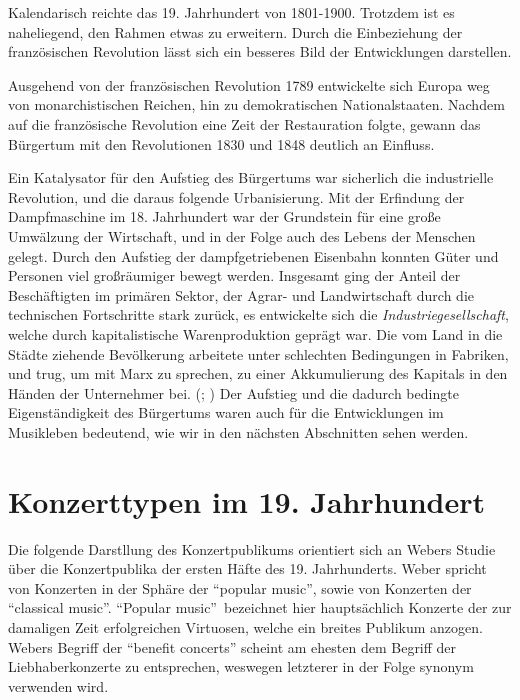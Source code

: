 \documentclass[a4paper, german, oneside]{scrbook}
\newcommand{\citep}[1]{\parencite{#1}}
\begin{document}
Kalendarisch reichte das 19. Jahrhundert von 1801-1900. Trotzdem ist es naheliegend, den Rahmen etwas zu erweitern. Durch die Einbeziehung der französischen Revolution lässt sich ein besseres Bild der Entwicklungen darstellen.

Ausgehend von der französischen Revolution 1789 entwickelte sich Europa weg von monarchistischen Reichen, hin zu demokratischen Nationalstaaten. Nachdem auf die französische Revolution eine Zeit der Restauration folgte, gewann das Bürgertum mit den Revolutionen 1830 und 1848 deutlich an Einfluss. \parencite[vgl.][253ff.]{demandt_kleine_2003}

Ein Katalysator für den Aufstieg des Bürgertums war sicherlich die industrielle Revolution, und die daraus folgende Urbanisierung. Mit der Erfindung der Dampfmaschine im 18. Jahrhundert war der Grundstein für eine große Umwälzung der Wirtschaft, und in der Folge auch des Lebens der Menschen gelegt. Durch den Aufstieg der dampfgetriebenen Eisenbahn konnten Güter und Personen viel großräumiger bewegt werden. Insgesamt ging der Anteil der Beschäftigten im primären Sektor, der Agrar- und Landwirtschaft durch die technischen Fortschritte stark zurück, es entwickelte sich die \emph{Industriegesellschaft}, welche durch kapitalistische Warenproduktion geprägt war. Die vom Land in die Städte ziehende Bevölkerung arbeitete unter schlechten Bedingungen in Fabriken, und trug, um mit Marx zu sprechen, zu einer Akkumulierung des Kapitals in den Händen der Unternehmer bei. (\cite{marx_kapital:_1989}; \cite[368]{hillmann_worterbuch_2007}) Der Aufstieg und die dadurch bedingte Eigenständigkeit des Bürgertums waren auch für die Entwicklungen im Musikleben bedeutend, wie wir in den nächsten Abschnitten sehen werden.


\section{Konzerttypen im 19. Jahrhundert}
\label{konzerttypen}
Die folgende Darstllung des Konzertpublikums orientiert sich an Webers Studie über die Konzertpublika der ersten Häfte des 19. Jahrhunderts. \citep{weber_music_2004} Weber spricht von Konzerten in der Sphäre der \enquote{popular music}, sowie von Konzerten der \enquote{classical music}. \enquote{Popular music} bezeichnet hier hauptsächlich Konzerte der zur damaligen Zeit erfolgreichen Virtuosen, welche ein breites Publikum anzogen. Webers Begriff der \enquote{benefit concerts} scheint am ehesten dem Begriff der Liebhaberkonzerte zu entsprechen, weswegen letzterer in der Folge synonym verwenden wird. 
\end{document}
